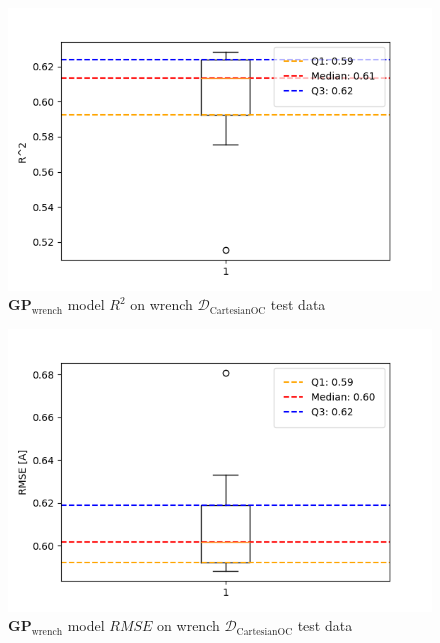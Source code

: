     \begin{figure}[H]
    \centering
    \includegraphics[width=1\columnwidth]{Images/05_results/wrench_boxplot_test_OC_R^2.png}
    \caption[\(\boldsymbol{GP}_{\text{wrench}}\) model \(R^2\) on wrench \(\mathcal{D}_{\text{CartesianOC}}\) test data]{\(\boldsymbol{GP}_{\text{wrench}}\) model \(R^2\) on wrench \(\mathcal{D}_{\text{CartesianOC}}\) test data}
    \label{fig:wrench_oc_R^2_test}
    \end{figure}

    \begin{figure}[H]
    \centering
    \includegraphics[width=1\columnwidth]{Images/05_results/wrench_boxplot_test_OC_RMSE.png}
    \caption[\(\boldsymbol{GP}_{\text{wrench}}\) model \(RMSE\) on wrench \(\mathcal{D}_{\text{CartesianOC}}\) test data]{\(\boldsymbol{GP}_{\text{wrench}}\) model \(RMSE\) on wrench \(\mathcal{D}_{\text{CartesianOC}}\) test data}
    \label{fig:wrench_oc_RMSE_test}
    \end{figure}
    
